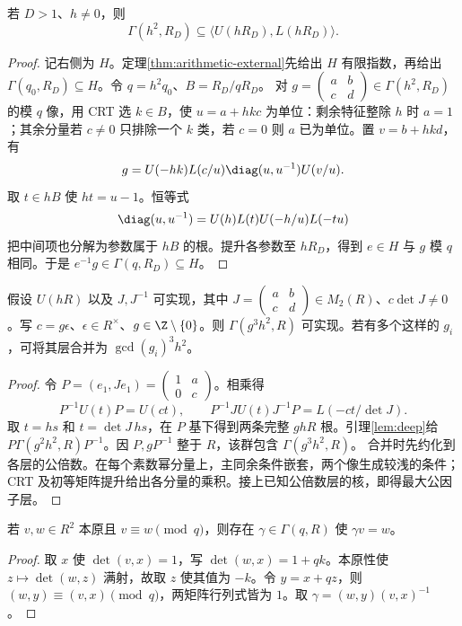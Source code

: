 \begin{lemma}\label{lem:deep}
若 $D>1$、$h\ne0$，则
\[
\Gamma(h^2,R_D)\subseteq\langle U(hR_D),L(hR_D)\rangle.
\]
\end{lemma}
\begin{proof}
记右侧为 $H$。定理\ref{thm:arithmetic-external}先给出 $H$ 有限指数，再给出 $\Gamma(q_0,R_D)\subseteq H$。令 $q=h^2q_0$、$B=R_D/qR_D$。
对 $g=\left(\begin{smallmatrix}a&b\\c&d\end{smallmatrix}\right)\in\Gamma(h^2,R_D)$ 的模 $q$ 像，用 CRT 选 $k\in B$，使 $u=a+hkc$ 为单位：剩余特征整除 $h$ 时 $a=1$；其余分量若 $c\ne0$ 只排除一个 $k$ 类，若 $c=0$ 则 $a$ 已为单位。置 $v=b+hkd$，有
\[
g=U(-hk)L(c/u)\diag(u,u^{-1})U(v/u).
\]
取 $t\in hB$ 使 $ht=u-1$。恒等式
\[
\diag(u,u^{-1})=U(h)L(t)U(-h/u)L(-tu)
\]
把中间项也分解为参数属于 $hB$ 的根。提升各参数至 $hR_D$，得到 $e\in H$ 与 $g$ 模 $q$ 相同。于是 $e^{-1}g\in\Gamma(q,R_D)\subseteq H$。
\end{proof}

\begin{lemma}\label{lem:transverse}
假设 $U(hR)$ 以及 $J,J^{-1}$ 可实现，其中 $J=\left(\begin{smallmatrix}a&b\\c&d\end{smallmatrix}\right)\in M_2(R)$、$c\det J\ne0$。写 $c=g\epsilon$、$\epsilon\in R^\times$、$g\in\Z\setminus\{0\}$。则 $\Gamma(g^3h^2,R)$ 可实现。若有多个这样的 $g_i$，可将其层合并为 $\gcd(g_i)^3h^2$。
\end{lemma}
\begin{proof}
令 $P=(e_1,Je_1)=\left(\begin{smallmatrix}1&a\\0&c\end{smallmatrix}\right)$。相乘得
\[
P^{-1}U(t)P=U(ct),\qquad
P^{-1}JU(t)J^{-1}P=L(-ct/\det J).
\]
取 $t=hs$ 和 $t=\det J\,hs$，在 $P$ 基下得到两条完整 $ghR$ 根。引理\ref{lem:deep}给 $P\Gamma(g^2h^2,R)P^{-1}$。因 $P,gP^{-1}$ 整于 $R$，该群包含 $\Gamma(g^3h^2,R)$。
合并时先约化到各层的公倍数。在每个素数幂分量上，主同余条件嵌套，两个像生成较浅的条件；CRT 及初等矩阵提升给出各分量的乘积。接上已知公倍数层的核，即得最大公因子层。
\end{proof}

\begin{lemma}\label{lem:fiber}
若 $v,w\in R^2$ 本原且 $v\equiv w\pmod q$，则存在 $\gamma\in\Gamma(q,R)$ 使 $\gamma v=w$。
\end{lemma}
\begin{proof}
取 $x$ 使 $\det(v,x)=1$，写 $\det(w,x)=1+qk$。本原性使 $z\mapsto\det(w,z)$ 满射，故取 $z$ 使其值为 $-k$。令 $y=x+qz$，则 $(w,y)\equiv(v,x)\pmod q$，两矩阵行列式皆为 $1$。取 $\gamma=(w,y)(v,x)^{-1}$。
\end{proof}

